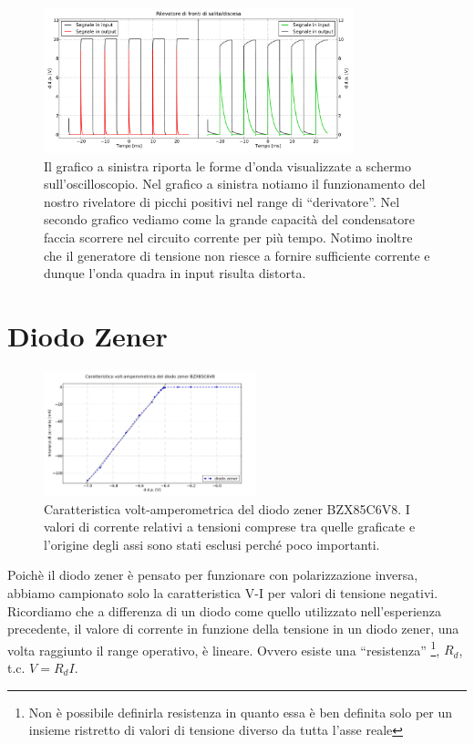 \begin{figure}[H]
\center
	\includegraphics[width=0.80\textwidth]{peaks(2).pdf}
	\caption{Il grafico a sinistra riporta le forme d'onda visualizzate a schermo sull'oscilloscopio. Nel grafico a sinistra notiamo il funzionamento del nostro rivelatore di picchi positivi nel range di ``derivatore''. Nel secondo grafico vediamo come la grande capacità del condensatore faccia scorrere nel circuito corrente per più tempo. Notimo inoltre che il generatore di tensione non riesce a fornire sufficiente corrente e dunque l'onda quadra in input risulta distorta.}
	\label{fig:peaks}
\end{figure}


\section{Diodo Zener}


\begin{figure}
\center
	\includegraphics[width=0.55\textwidth]{VI_zener.pdf}
	\caption{Caratteristica volt-amperometrica del diodo zener BZX85C6V8. I valori di corrente relativi a tensioni comprese tra quelle graficate e l'origine degli assi sono stati esclusi perché poco importanti.}
	\label{fig:VI_zener}
\end{figure}

Poichè il diodo zener è pensato per funzionare con polarizzazione inversa, abbiamo campionato solo la caratteristica V-I per valori di tensione negativi. Ricordiamo che a differenza di un diodo come quello utilizzato nell'esperienza precedente, il valore di corrente in funzione della tensione in un diodo zener, una volta raggiunto il range operativo, è lineare. Ovvero esiste una ``resistenza'' \footnote{Non è possibile definirla resistenza in quanto essa è ben definita solo per un insieme ristretto di valori di tensione diverso da tutta l'asse reale}, $R_d$, t.c. $V=R_d I$.


